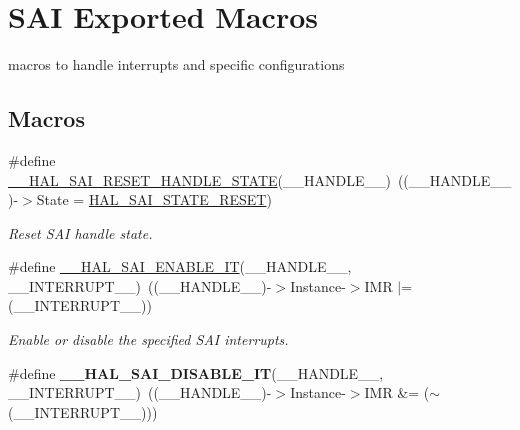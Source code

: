 \hypertarget{group___s_a_i___exported___macros}{}\section{S\+AI Exported Macros}
\label{group___s_a_i___exported___macros}


macros to handle interrupts and specific configurations  


\subsection*{Macros}
\begin{DoxyCompactItemize}
\item 
\#define \hyperlink{group___s_a_i___exported___macros_ga45b0ef0710229953f17d04ff7764f620}{\+\_\+\+\_\+\+H\+A\+L\+\_\+\+S\+A\+I\+\_\+\+R\+E\+S\+E\+T\+\_\+\+H\+A\+N\+D\+L\+E\+\_\+\+S\+T\+A\+TE}(\+\_\+\+\_\+\+H\+A\+N\+D\+L\+E\+\_\+\+\_\+)~((\+\_\+\+\_\+\+H\+A\+N\+D\+L\+E\+\_\+\+\_\+)-\/$>$State = \hyperlink{group___s_a_i___exported___types_ggac758df9679f0ee29c77d9b1b66289589a4c5621e3b54c74b9f1f1ddfb1258c40d}{H\+A\+L\+\_\+\+S\+A\+I\+\_\+\+S\+T\+A\+T\+E\+\_\+\+R\+E\+S\+ET})
\begin{DoxyCompactList}\small\item\em Reset S\+AI handle state. \end{DoxyCompactList}\item 
\#define \hyperlink{group___s_a_i___exported___macros_gaa95d2cf8b2104cc1a51d71cd4e809d37}{\+\_\+\+\_\+\+H\+A\+L\+\_\+\+S\+A\+I\+\_\+\+E\+N\+A\+B\+L\+E\+\_\+\+IT}(\+\_\+\+\_\+\+H\+A\+N\+D\+L\+E\+\_\+\+\_\+,  \+\_\+\+\_\+\+I\+N\+T\+E\+R\+R\+U\+P\+T\+\_\+\+\_\+)~((\+\_\+\+\_\+\+H\+A\+N\+D\+L\+E\+\_\+\+\_\+)-\/$>$Instance-\/$>$I\+MR $\vert$= (\+\_\+\+\_\+\+I\+N\+T\+E\+R\+R\+U\+P\+T\+\_\+\+\_\+))
\begin{DoxyCompactList}\small\item\em Enable or disable the specified S\+AI interrupts. \end{DoxyCompactList}\item 
\#define {\bfseries \+\_\+\+\_\+\+H\+A\+L\+\_\+\+S\+A\+I\+\_\+\+D\+I\+S\+A\+B\+L\+E\+\_\+\+IT}(\+\_\+\+\_\+\+H\+A\+N\+D\+L\+E\+\_\+\+\_\+,  \+\_\+\+\_\+\+I\+N\+T\+E\+R\+R\+U\+P\+T\+\_\+\+\_\+)~((\+\_\+\+\_\+\+H\+A\+N\+D\+L\+E\+\_\+\+\_\+)-\/$>$Instance-\/$>$I\+MR \&= ($\sim$(\+\_\+\+\_\+\+I\+N\+T\+E\+R\+R\+U\+P\+T\+\_\+\+\_\+)))\hypertarget{group___s_a_i___exported___macros_ga75f5b39f3d8044d21510fbf9bb416317}{}\label{group___s_a_i___exported___macros_ga75f5b39f3d8044d21510fbf9bb416317}


\end{DoxyCompactItemize}
